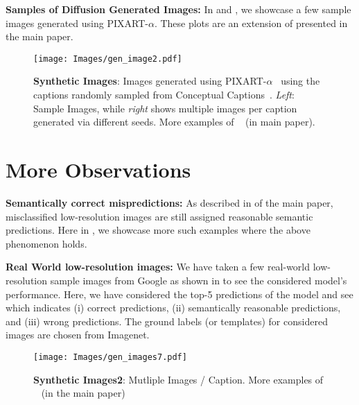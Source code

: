 \noindent \textbf{Samples of Diffusion Generated Images:}
In \textbf{} and \textbf{}, we showcase a few sample images generated using PIXART-$\alpha$. These plots are an extension of  presented in the main paper.

\begin{figure}[!t]
\centering
{}
\hfill
\subfloat
{
\texttt{[image: Images/gen\_image2.pdf]}
}
\caption{ 
\textbf{Synthetic Images}: Images generated using PIXART-$\alpha$~\citep{chen2023pixartalpha} using the captions randomly sampled from Conceptual Captions~\citep{sharma2018conceptual}.
\textit{Left}: Sample Images, while \textit{right} shows multiple images per caption generated via different seeds.
More examples of ~ (in main paper).
}
\label{fig:ldm_images_1}
\vspace{-2pt}
\end{figure}


\section{More Observations}

\noindent \textbf{Semantically correct mispredictions:}
As described in  of the main paper, misclassified low-resolution images are still assigned reasonable semantic predictions. Here in \textbf{}, we showcase more such examples where the above phenomenon holds.

\noindent \textbf{Real World low-resolution images:} We have taken a few real-world low-resolution sample images from Google as shown in \textbf{} to see the considered model's performance. Here, we have considered the top-5 predictions of the model and see which indicates (i) correct predictions, (ii) semantically reasonable predictions, and (iii) wrong predictions. The ground labels (or templates) for considered images are chosen from Imagenet.


\begin{figure}[!t]
\centering
{}
\hfill
\subfloat
{
\texttt{[image: Images/gen\_images7.pdf]}
}
\caption{ 
\textbf{Synthetic Images2}: Mutliple Images / Caption. More examples of ~ (in the main paper)
}
\label{fig:ldm_images_2}
\vspace{-2pt}
\end{figure}









